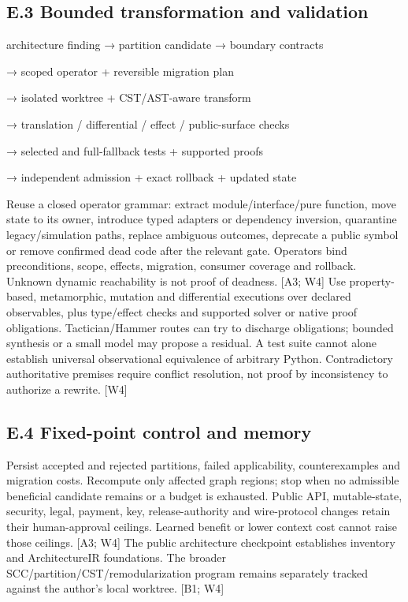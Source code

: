 \documentclass{article}
\begin{document}
\subsection*{E.3 Bounded transformation and validation}

\noindent architecture finding → partition candidate → boundary contracts\par
\noindent → scoped operator + reversible migration plan\par
\noindent → isolated worktree + CST/AST-aware transform\par
\noindent → translation / differential / effect / public-surface checks\par
\noindent → selected and full-fallback tests + supported proofs\par
\noindent → independent admission + exact rollback + updated state\par

Reuse a closed operator grammar: extract module/interface/pure function, move state to its owner,
introduce typed adapters or dependency inversion, quarantine legacy/simulation paths, replace
ambiguous outcomes, deprecate a public symbol or remove confirmed dead code after the relevant
gate. Operators bind preconditions, scope, effects, migration, consumer coverage and rollback.
Unknown dynamic reachability is not proof of deadness. [A3; W4]
Use property-based, metamorphic, mutation and differential executions over declared observables,
plus type/effect checks and supported solver or native proof obligations. Tactician/Hammer routes
can try to discharge obligations; bounded synthesis or a small model may propose a residual. A test
suite cannot alone establish universal observational equivalence of arbitrary Python. Contradictory
authoritative premises require conflict resolution, not proof by inconsistency to authorize a rewrite.
[W4]

\subsection*{E.4 Fixed-point control and memory}

Persist accepted and rejected partitions, failed applicability, counterexamples and migration costs.
Recompute only affected graph regions; stop when no admissible beneficial candidate remains or a
budget is exhausted. Public API, mutable-state, security, legal, payment, key, release-authority and
wire-protocol changes retain their human-approval ceilings. Learned benefit or lower context cost
cannot raise those ceilings. [A3; W4]
The public architecture checkpoint establishes inventory and ArchitectureIR foundations. The broader
SCC/partition/CST/remodularization program remains separately tracked against the author’s local
worktree. [B1; W4]
\end{document}
